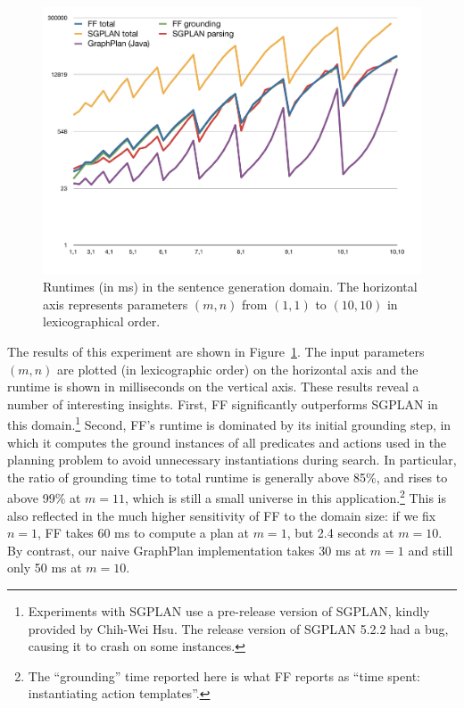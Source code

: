 \begin{figure}
  \centering
  \includegraphics[width=1\columnwidth]{pic-runtime-modifiers-with-sgplan}
  \caption{Runtimes (in ms) in the sentence generation domain.  The
    horizontal axis represents parameters $(m,n)$ from $(1,1)$ to
    $(10,10)$ in lexicographical order.}
  \label{fig:runtimes-crisp}
\end{figure}

The results of this experiment are shown in
Figure~\ref{fig:runtimes-crisp}. The input parameters $(m,n)$ are plotted
(in lexicographic order) on the horizontal axis and the runtime is shown in
milliseconds on the vertical axis. These results reveal a number of
interesting insights. First, FF significantly outperforms
SGPLAN in this domain.\footnote{Experiments with SGPLAN use a
 pre-release version of SGPLAN, kindly provided by Chih-Wei Hsu. The
 release version of SGPLAN 5.2.2 had a bug, causing it to crash on some
 instances.}
Second, FF's runtime is dominated by its initial grounding step, in which
it computes the ground instances of all predicates and actions used in the
planning problem to avoid unnecessary instantiations during search. In
particular, the ratio of grounding time to total runtime is generally above
85\%, and rises to above 99\% at $m=11$, which is still a small universe in
this application.\footnote{The
  ``grounding'' time reported here is what FF reports as ``time spent:
  instantiating action templates''.}  This is also reflected in the
much higher sensitivity of FF to the domain size: if we fix $n=1$, FF takes
60 ms to compute a plan at $m=1$, but 2.4 seconds at $m=10$. By contrast,
our naive GraphPlan implementation takes 30 ms at $m=1$ and still only 50
ms at $m=10$.

